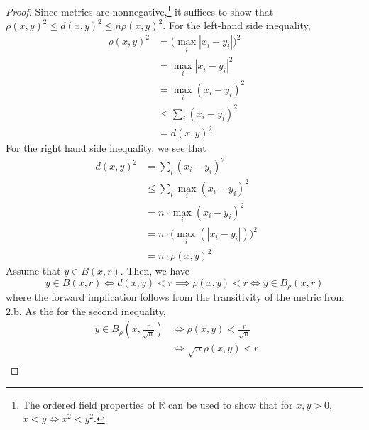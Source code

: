       \begin{proof}
        Since metrics are nonnegative,\footnote{The ordered field properties of $\mathbb{R}$ can be used to show that for $x, y > 0$, $x < y \iff x^2 < y^2$.} it suffices to show that $\rho(x, y)^2 \leq d(x, y)^2 \leq n \rho (x, y)^2$. For the left-hand side inequality, 
        \begin{align}
          \rho(x, y)^2 & = \big( \max_i |x_i - y_i| \big)^2 && \tag{definition of $L_\infty$ metric}\\
                       & = \max_i | x_i - y_i|^2 && \tag{can move square inside since $|x_i - y_i| > 0$ for all $i$}\\
                       & = \max_i (x_i - y_i)^2 && \tag{absolute value is irrlevant if we are squaring it}\\
                       & \leq \sum_i (x_i - y_i)^2 && \tag{sum contains the max with all nonnegative elements}\\
                       & = d(x, y)^2 && \tag{definition of $L_2$ metric}
        \end{align}
        For the right hand side inequality, we see that 
        \begin{align}
          d(x, y)^2 & = \sum_i (x_i - y_i)^2 && \tag{definition of $L_2$ metric}\\
                    & \leq \sum_i \max_i ( x_i - y_i)^2 && \tag{bound each element by the max of the elements}\\
                    & = n \cdot \max_i (x_i - y_i)^2 && \tag{since it's a sum of constant elements}\\
                    & = n \cdot \big( \max_i (|x_i - y_i|)\big)^2 && \tag{equivalent by previous logic}\\
                    & = n \cdot \rho(x, y)^2 && \tag{definition of $L_\infty$ norm}
        \end{align}
        Assume that $y \in B(x, r)$. Then, we have 
        \begin{equation}
          y \in B(x, r) \iff d(x, y) < r \implies \rho(x, y) < r \iff y \in B_\rho (x, r) 
        \end{equation}
        where the forward implication follows from the transitivity of the metric from 2.b. As the for the second inequality, 
        \begin{align}
          y \in B_\rho (x, \frac{r}{\sqrt{n}}) & \iff \rho(x, y) < \frac{r}{\sqrt{n}}\\ 
                                               & \iff \sqrt{n} \rho(x, y) < r && \tag{$n > 0$}\\

\end{align}
\end{proof}
